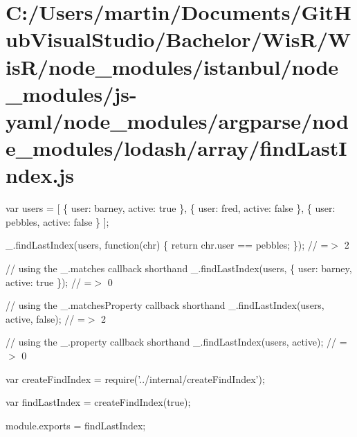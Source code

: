 \hypertarget{_c_1_2_users_2martin_2_documents_2_git_hub_visual_studio_2_bachelor_2_wis_r_2_wis_r_2node_module3b6e297d30ac0d41389c782cfa27340e}{}\section{C\+:/\+Users/martin/\+Documents/\+Git\+Hub\+Visual\+Studio/\+Bachelor/\+Wis\+R/\+Wis\+R/node\+\_\+modules/istanbul/node\+\_\+modules/js-\/yaml/node\+\_\+modules/argparse/node\+\_\+modules/lodash/array/find\+Last\+Index.\+js}
var users = \mbox{[} \{ \textquotesingle{}user\textquotesingle{}\+: \textquotesingle{}barney\textquotesingle{}, \textquotesingle{}active\textquotesingle{}\+: true \}, \{ \textquotesingle{}user\textquotesingle{}\+: \textquotesingle{}fred\textquotesingle{}, \textquotesingle{}active\textquotesingle{}\+: false \}, \{ \textquotesingle{}user\textquotesingle{}\+: \textquotesingle{}pebbles\textquotesingle{}, \textquotesingle{}active\textquotesingle{}\+: false \} \mbox{]};

\+\_\+.\+find\+Last\+Index(users, function(chr) \{ return chr.\+user == \textquotesingle{}pebbles\textquotesingle{}; \}); // =$>$ 2

// using the {\ttfamily \+\_\+.\+matches} callback shorthand \+\_\+.\+find\+Last\+Index(users, \{ \textquotesingle{}user\textquotesingle{}\+: \textquotesingle{}barney\textquotesingle{}, \textquotesingle{}active\textquotesingle{}\+: true \}); // =$>$ 0

// using the {\ttfamily \+\_\+.\+matches\+Property} callback shorthand \+\_\+.\+find\+Last\+Index(users, \textquotesingle{}active\textquotesingle{}, false); // =$>$ 2

// using the {\ttfamily \+\_\+.\+property} callback shorthand \+\_\+.\+find\+Last\+Index(users, \textquotesingle{}active\textquotesingle{}); // =$>$ 0


\begin{DoxyCodeInclude}
var createFindIndex = require(\textcolor{stringliteral}{'../internal/createFindIndex'});

var findLastIndex = createFindIndex(\textcolor{keyword}{true});

module.exports = findLastIndex;
\end{DoxyCodeInclude}
 